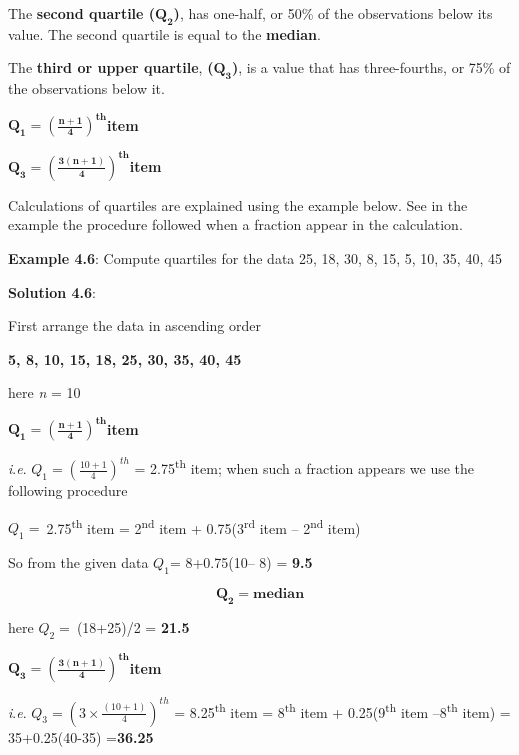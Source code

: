 \documentclass[
]{book}
\begin{document}
The \textbf{second quartile (}\(\mathbf{Q}_{\mathbf{2}}\)\textbf{)}, has one-half,
or 50\% of the observations below its value. The second quartile is equal
to the \textbf{median}.

The \textbf{third or upper quartile}, \textbf{(}\(\mathbf{Q}_{\mathbf{3}}\)\textbf{)}, is
a value that has three-fourths, or 75\% of the observations below it.

\(\mathbf{Q}_{\mathbf{1}}\mathbf{=}\left( \frac{\mathbf{n + 1}}{\mathbf{4}} \right)^{\mathbf{\text{th}}}\)\textbf{item}

\(\mathbf{Q}_{\mathbf{3}}\mathbf{=}\left( \frac{\mathbf{3(n + 1)}}{\mathbf{4}} \right)^{\mathbf{\text{th}}}\)\textbf{item}

Calculations of quartiles are explained using the example below. See in
the example the procedure followed when a fraction appear in the
calculation.

\textbf{Example 4.6}: Compute quartiles for the data 25, 18, 30, 8, 15, 5,
10, 35, 40, 45

\textbf{Solution 4.6}:

First arrange the data in ascending order

\textbf{5, 8, 10, 15, 18, 25, 30, 35, 40, 45}

here \emph{n} = 10

\(\mathbf{Q}_{\mathbf{1}}\mathbf{=}\left( \frac{\mathbf{n + 1}}{\mathbf{4}} \right)^{\mathbf{\text{th}}}\)\textbf{item}

\emph{i}.\emph{e}. \(Q_{1} = \left( \frac{10 + 1}{4} \right)^{th}\) = 2.75\textsuperscript{th} item;
when such a fraction appears we use the following procedure

\(Q_{1} = \ \)2.75\textsuperscript{th} item = 2\textsuperscript{nd} item + 0.75(3\textsuperscript{rd}
item -- 2\textsuperscript{nd} item)

So from the given data \(Q_{1}\)= 8+0.75(10-- 8) = \textbf{9.5}

\[\mathbf{Q}_{\mathbf{2}}\mathbf{= median}\]

here \(Q_{2} = \ \)(18+25)/2 = \textbf{21.5}

\(\mathbf{Q}_{\mathbf{3}}\mathbf{=}\left( \frac{\mathbf{3(n + 1)}}{\mathbf{4}} \right)^{\mathbf{\text{th}}}\)\textbf{item}

\emph{i}.\emph{e}. \(Q_{3} = \left( 3 \times \frac{(10 + 1)}{4} \right)^{th}\) =
8.25\textsuperscript{th} item = 8\textsuperscript{th} item + 0.25(9\textsuperscript{th} item --8\textsuperscript{th} item) =
35+0.25(40-35) =\textbf{36.25}
\end{document}
